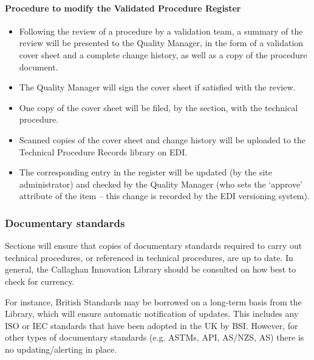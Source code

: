 \paragraph{Procedure to modify the Validated Procedure Register}
\begin{itemize}
\item Following the review of a procedure by a validation team, a summary of the review will be presented to the Quality Manager, in the form of a validation cover sheet and a complete change history, as well as a copy of the procedure document.
\item The Quality Manager will sign the cover sheet if satisfied with the review.
\item One copy of the cover sheet will be filed, by the section, with the technical procedure. 
\item Scanned copies of the cover sheet and change history will be uploaded to the Technical Procedure Records library on EDI.
\item The corresponding entry in the register will be updated (by the site administrator) and checked by the Quality Manager (who sets the ‘approve’ attribute of the item – this change is recorded by the EDI versioning system).
\end{itemize} 

\subsubsection{Documentary standards}
Sections will ensure that copies of documentary standards required to carry out technical procedures, or referenced in technical procedures, are up to date. 
In general, the Callaghan Innovation Library should be consulted on how best to check for currency.

For instance, British Standards may be borrowed on a long-term basis from the Library, which will ensure automatic notification of updates. This includes any ISO or IEC standards that have been adopted in the UK by BSI. However, for other types of documentary standards (e.g. ASTMs, API, AS/NZS, AS) there is no updating/alerting in place. 